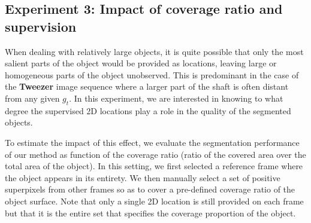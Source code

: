 \subsection{Experiment 3: Impact of coverage ratio and supervision}
When dealing with relatively large objects, it is quite possible that only the most salient parts of the object would be provided as locations, leaving large or homogeneous parts of the object unobserved. This is predominant in the case of the {\bf Tweezer} image sequence where a larger part of the shaft is often distant from any given $g_t$. In this experiment, we are interested in knowing to what degree the supervised 2D locations play a role in the quality of the segmented objects.

To estimate the impact of this effect, we evaluate the segmentation performance of our method as function of the coverage ratio (\ie ratio of the covered area over the total area of the object).
In this setting, we first selected a reference frame where the object appears in its entirety. We then manually select a set of positive superpixels from other frames so as to cover a pre-defined coverage ratio of the object surface. Note that only a single 2D location is still provided on each frame but that it is the entire set that specifies the coverage proportion of the object.
